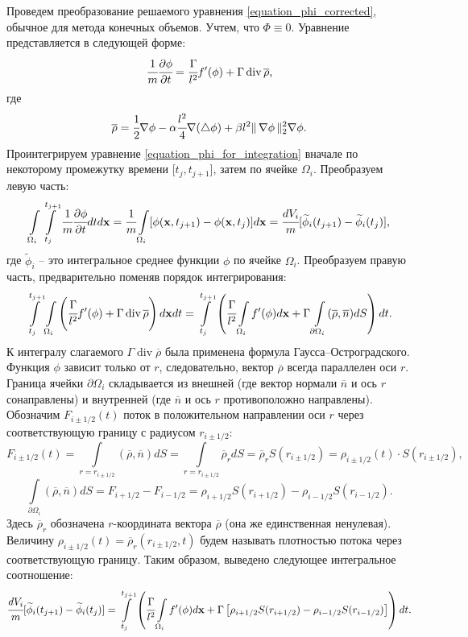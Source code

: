 \documentclass[a4paper,12pt]{article}
\DeclareMathOperator{\Div}{div}
\theoremstyle{plain}
\theoremstyle{definition}
\begin{document}
Проведем преобразование решаемого уравнения \eqref{equation_phi_corrected}, обычное для метода конечных объемов. Учтем, что $\Phi \equiv 0$. Уравнение представляется в следующей форме:
\begin{equation}
    \cfrac{1}{m} \cfrac{\partial \phi}{\partial t} = \cfrac{\Gamma}{l^2} f'(\phi) + \Gamma \Div \overline{\rho} \text{,}
    \label{equation_phi_for_integration}
\end{equation}
где
$$\overline{\rho} = \cfrac{1}{2} \nabla \phi - \alpha \cfrac{l^2}{4} \nabla (\triangle \phi) + \beta l^2 \| \, \nabla \phi \, \|_2^2 \nabla \phi \text{.}$$
Проинтегрируем уравнение \eqref{equation_phi_for_integration} вначале по некоторому промежутку времени [$t_j, t_{j + 1}]$, затем по ячейке $\Omega_i$. Преобразуем левую часть:
$$\int\limits_{\Omega_i} \int\limits_{t_j}^{t_{j + 1}} \cfrac{1}{m} \cfrac{\partial \phi}{\partial t} dt d \mathbf{x} = \cfrac{1}{m} \int\limits_{\Omega_i} [\phi(\mathbf{x}, t_{j + 1}) - \phi(\mathbf{x}, t_j)] d \mathbf{x} = \cfrac{dV_i}{m} [\widetilde{\phi}_i(t_{j + 1}) - \widetilde{\phi}_i(t_j)] \text{,}$$
где $\widetilde{\phi}_i$ -- это интегральное среднее функции $\phi$ по ячейке $\Omega_i$. Преобразуем правую часть, предварительно поменяв порядок интегрирования:
$$\int\limits_{t_j}^{t_{j + 1}} \int\limits_{\Omega_i} \left( \cfrac{\Gamma}{l^2} f'(\phi) + \Gamma \Div \overline{\rho} \right) d \mathbf{x} dt = \int\limits_{t_j}^{t_{j + 1}} \left( \cfrac{\Gamma}{l^2} \int\limits_{\Omega_i} f'(\phi) d \mathbf{x} + \Gamma \int\limits_{\partial \Omega_i} (\overline{\rho}, \overline{n}) dS \right) dt \text{.}$$
К интегралу слагаемого $\Gamma \Div \overline{\rho}$ была применена формула Гаусса--Остроградского. Функция $\phi$ зависит только от $r$, следовательно, вектор $\overline{\rho}$ всегда параллелен оси $r$. Граница ячейки $\partial \Omega_i$ складывается из внешней (где вектор нормали $\overline{n}$ и ось $r$ сонаправлены) и внутренней (где $\overline{n}$ и ось $r$ противоположно направлены). Обозначим $F_{i \pm 1/2}(t)$ поток в положительном направлении оси $r$ через соответствующую границу с радиусом $r_{i \pm 1/2}$:
$$F_{i \pm 1/2}(t) = \int\limits_{r = r_{i \pm 1/2}} (\overline{\rho}, \overline{n}) dS = \int\limits_{r = r_{i \pm 1/2}} \overline{\rho}_r dS = \overline{\rho}_r S(r_{i \pm 1/2}) = \rho_{i \pm 1/2}(t) \cdot S(r_{i \pm 1/2}) \text{,}$$
$$\int\limits_{\partial \Omega_i} (\overline{\rho}, \overline{n}) dS = F_{i + 1/2} - F_{i - 1/2} = \rho_{i + 1/2} S(r_{i + 1/2}) - \rho_{i - 1/2} S(r_{i - 1/2}) \text{.}$$
Здесь $\overline{\rho}_r$ обозначена $r$-координата вектора $\overline{\rho}$ (она же единственная ненулевая). Величину $\rho_{i \pm 1/2}(t) = \overline{\rho}_r(r_{i \pm 1/2}, t)$ будем называть плотностью потока через соответствующую границу. Таким образом, выведено следующее интегральное соотношение:
\begin{equation}
    \cfrac{dV_i}{m} [\widetilde{\phi}_i(t_{j + 1}) - \widetilde{\phi}_i(t_j)] = \int\limits_{t_j}^{t_{j + 1}} \left( \cfrac{\Gamma}{l^2} \int\limits_{\Omega_i} f'(\phi) d \mathbf{x} + \Gamma \left[ \rho_{i + 1/2} S(r_{i + 1/2}) - \rho_{i - 1/2} S(r_{i - 1/2}) \right] \right) dt \text{.}
    \label{equation_finite_volume_integral}
\end{equation}
\end{document}
